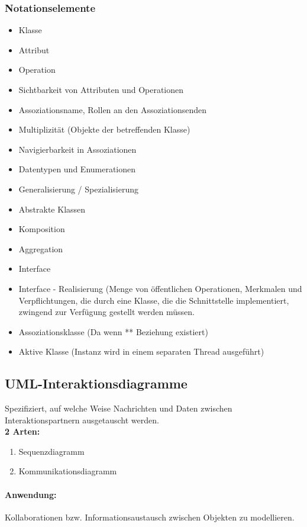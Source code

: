\documentclass[../ZF_SWEN1.tex]{subfiles}
\begin{document}
\subsubsection{Notationselemente}
\begin{itemize}
	\item Klasse
	\item Attribut
	\item Operation
	\item Sichtbarkeit von Attributen und Operationen
	\item Assoziationsname, Rollen an den Assoziationsenden
	\item Multiplizität (Objekte der betreffenden Klasse)
	\item Navigierbarkeit in Assoziationen
	\item Datentypen und Enumerationen
	\item Generalisierung / Spezialisierung
	\item Abstrakte Klassen
	\item Komposition
	\item Aggregation
	\item Interface
	\item Interface - Realisierung (Menge von öffentlichen Operationen, Merkmalen und Verpflichtungen, die durch eine Klasse, die die Schnittstelle implementiert, zwingend zur Verfügung gestellt werden müssen.
	\item Assoziationsklasse (Da wenn ** Beziehung existiert)
	\item Aktive Klasse (Instanz wird in einem separaten Thread ausgeführt)
\end{itemize}

\subsection{UML-Interaktionsdiagramme}

Spezifiziert, auf welche Weise Nachrichten und Daten zwischen Interaktionspartnern ausgetauscht werden. \\

\textcolor {WildStrawberry}{\textbf{2 Arten:}}
\begin{enumerate}
	\item Sequenzdiagramm
	\item Kommunikationsdiagramm
\end{enumerate}

\paragraph{\textcolor {WildStrawberry}{\textbf{Anwendung:}}} Kollaborationen bzw. Informationsaustausch zwischen Objekten zu modellieren.
\end{document}

